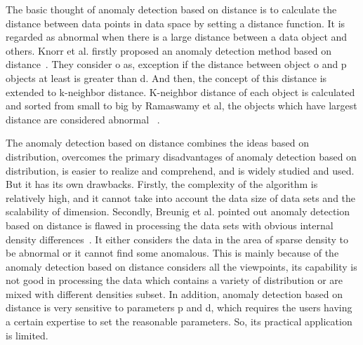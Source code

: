 The basic thought of anomaly detection based on
distance is to calculate the distance between data points in
data space by setting a distance function.
It is regarded as
abnormal when there is a large distance between a data
object and others.
Knorr et al.
firstly proposed an anomaly
detection method based on distance~\cite{knorr1997unified}.
They consider o as,
exception if the distance between object o and
p objects at least is greater than d.
And then,
the concept of this distance is extended to k-neighbor distance.
K-neighbor distance of each object is calculated and
sorted from small to big by Ramaswamy et al,
the objects which have largest
distance are considered abnormal~\cite{ramaswamy2000efficient} .

The anomaly detection based on distance combines the ideas
based on distribution,
overcomes the primary disadvantages
of anomaly detection based on distribution,
is easier to realize and comprehend,
and is widely studied and used.
But it has its own drawbacks.
Firstly,
the complexity of the algorithm is relatively high,
and it cannot take into account
the data size of data sets and the scalability of dimension.
Secondly,
Breunig et al.
pointed out anomaly detection based on distance is flawed in
processing the data sets with obvious internal density
differences~\cite{breunig2000lof}.
It either considers the data in the area of sparse
density to be abnormal or
it cannot find some anomalous.
This is mainly because of the anomaly detection based on
distance considers all the viewpoints,
its capability is not good in processing the data which
contains a variety of distribution or
are mixed with different densities subset.
In addition,
anomaly detection based on distance is very
sensitive to parameters p and d,
which requires the users
having a certain expertise to set the reasonable parameters.
So,
its practical application is limited.

